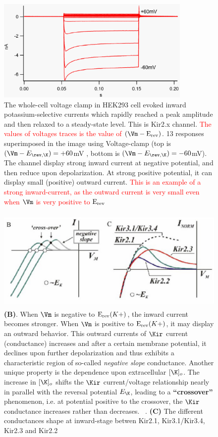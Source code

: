 \begin{figure}[hbt]
 \centerline{\includegraphics[height=5cm, angle=0]{./images/inward_current.eps}}
\caption{ The whole-cell voltage clamp in HEK293 cell evoked inward
potassium-selective currents which rapidly reached a peak amplitude and then
relaxed to a steady-state level. This is Kir2.x channel. \textcolor{red}{The
values of voltages traces is the value of} $(\Vm - \Erev)$. 13 responses
superimposed in the image using Voltage-clamp (top is 
$(\Vm -E_{\rev,\K}) = +60 $mV , bottom is $(\Vm - E_{\rev,\K}) = -60$mV).
The channel display strong inward current at negative potential, and 
then reduce upon depolarization. At strong positive potential, it can display
small (positive) outward current. \textcolor{red}{This is an example of a
strong inward-current, as the outward current is very small even when $\Vm$ is
very positive to ${\text{E}_{\text{rev}}}$}}
\label{fig:rectifier_current}
\end{figure}


\begin{figure}[hbt]
  \centerline{\includegraphics[height=5cm,
    angle=0]{./images/Kir_current.eps}}
  \caption{{\bf (B)}. When $\Vm$ is negative to ${\text{E}_{\text{rev}}}(K+)$, the inward current
  becomes stronger. When $\Vm$ is positive to ${\text{E}_{\text{rev}}}(K+)$, it may display an outward
  behavior. This outward currents of $\Kir$ current (conductance) increases and
  after a certain membrane potential, it declines upon further depolarization
  and thus exhibits a characteristic region of so-called {\it negative slope}
conductance. Another unique property is the dependence upon extracellular
$[\K]_o$. The increase in $[\K]_o$ shifts the $\Kir$ current/voltage
relationship nearly in parallel with the reversal potential $E_\K$, leading to a
{\bf ``crossover''} phenomenon, i.e. at potential positive to the
crossover, the $\Kir$ conductance increases rather than decreases.
~\citep{Anumonwo2010}. {\bf (C)} The different conductances shape at
inward-stage betwen Kir2.1, Kir3.1/Kir3.4, Kir2.3 and Kir2.2}
\label{fig:Kir_current}
\end{figure}


